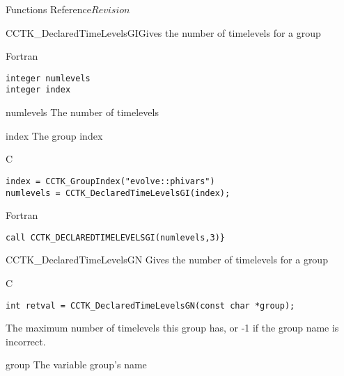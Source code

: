 \begin{cactuspart}{ Functions Reference}{}{$Revision$}
\begin{FunctionDescription}{CCTK\_DeclaredTimeLevelsGI}{Gives the number of timelevels for a group}
\begin{SynopsisSection}
\begin{Synopsis}{Fortran}
\begin{verbatim}
integer numlevels
integer index\end{verbatim}
\end{Synopsis}
\end{SynopsisSection}
\begin{ParameterSection}
\begin{Parameter}{numlevels}
The number of timelevels
\end{Parameter}
\begin{Parameter}{index}
The group index
\end{Parameter}
\end{ParameterSection}

\begin{ExampleSection}
\begin{Example}{C}
\begin{verbatim}
index = CCTK_GroupIndex("evolve::phivars")
numlevels = CCTK_DeclaredTimeLevelsGI(index);
\end{verbatim}
\end{Example}
\begin{Example}{Fortran}
\begin{verbatim}
call CCTK_DECLAREDTIMELEVELSGI(numlevels,3)}
\end{verbatim}
\end{Example}
\end{ExampleSection}
\end{FunctionDescription}


\begin{FunctionDescription}{CCTK\_DeclaredTimeLevelsGN}
\label{CCTK-DeclaredTimeLevelsGN}
Gives the number of timelevels for a group
\begin{SynopsisSection}
\begin{Synopsis}{C}
\begin{verbatim}int retval = CCTK_DeclaredTimeLevelsGN(const char *group);\end{verbatim}
\end{Synopsis}
\end{SynopsisSection}

\begin{ResultSection}
\begin{Result}{}
The maximum number of timelevels this group has, or -1 if the group name is incorrect.
\end{Result}
\end{ResultSection}

\begin{ParameterSection}
\begin{Parameter}{group}
The variable group's name
\end{Parameter}
\end{ParameterSection}


\end{FunctionDescription}
\end{cactuspart}

